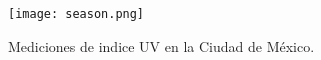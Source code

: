 \begin{frame}
    \renewcommand{\yourowntexcol}{black}
    \begin{figure}[H]
        \centering
        \texttt{[image: season.png]}
        \caption{Mediciones de indice UV en la Ciudad de México. \cite{SEDEMA_page}}
    \end{figure}
\end{frame}